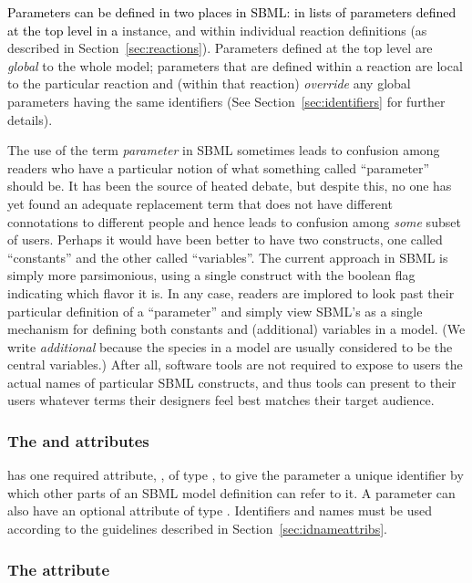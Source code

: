 \textcolor{black}{Parameters can be defined in two places in SBML: in lists of
parameters defined at the top level in a} \Model
instance, and within individual reaction definitions (as
described in Section~\ref{sec:reactions}).  Parameters defined at
the top level are \emph{global} to the whole model; parameters
that are defined within a reaction are local to the particular
reaction and (within that reaction) \emph{override} any global
parameters having the same identifiers (See
Section~\ref{sec:identifiers} for further details).

The use of the term \emph{parameter} in SBML sometimes leads to
confusion among readers who have a particular notion of what
something called ``parameter'' should be.  It has been the source
of heated debate, but despite this, no one has yet found an
adequate replacement term that does not have different
connotations to different people and hence leads to confusion
among \emph{some} subset of users.  Perhaps it would have been
better to have two constructs, one called ``constants'' and the
other called ``variables''.  The current approach in SBML is
simply more parsimonious, using a single \Parameter construct with
the boolean flag  indicating which flavor it is.
In any case, readers are implored to look past their particular
definition of a ``parameter'' and simply view SBML's \Parameter as
a single mechanism for defining both constants and (additional)
variables in a model.  (We write \emph{additional} because the
species in a model are usually considered to be the central
variables.)  After all, software tools are not required to expose
to users the actual names of particular SBML constructs, and thus
tools can present to their users whatever terms their designers
feel best matches their target audience.


\subsubsection{The  and  attributes}

\Parameter has one required attribute, , of type
, to give the parameter a unique identifier by which
other parts of an SBML model definition can refer to it.  A
parameter can also have an optional  attribute of type
.  Identifiers and names must be used according
to the guidelines described in Section~\ref{sec:idnameattribs}.


\subsubsection{The  attribute}
\label{sec:parameter-value}


